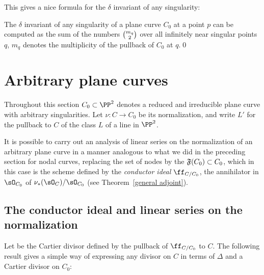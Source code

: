 This gives a nice formula for the $\delta$ invariant of any singularity:

\begin{corollary}
\label{computing delta}
The $\delta$ invariant of any singularity of a plane curve $C_{0}$ at
a point $p$ can be computed as the sum of the numbers $\tbinom{m_{q}}{2}$
over all infinitely near singular points $q$,
%
$m_{q}$
denotes the multiplicity of the pullback of $C_{0}$ at $q$.\qed
\end{corollary}

\section{Arbitrary plane curves} \label{arbitrary plane curves}

Throughout this section $C_0 \subset \PP^2$ denotes a reduced and
irreducible plane curve with arbitrary singularities. Let $\nu : C
\to C_0$ be its normalization, and write $L'$ for the pullback to $C$
of the class $L$ of a line in $\PP^{2}$.

It is possible to carry out an analysis of linear series on the
normalization of an arbitrary plane curve in a manner  analogous to
%
what we did in the preceding section for nodal curves, replacing 
the set of nodes by the 
%
$\adj(C_{0})\subset C_{0}$, which in this case is the scheme
%
%
defined by the \emph{conductor ideal} $\ff_{C/C_0}$, the annihilator
in $\sO_{C_{0}}$ of $\nu_{*}(\sO_{C})/\sO_{C_{0}}$
(see Theorem~\ref{general adjoint}). 

\subsection*{The conductor ideal and linear series on the normalization}

Let 
 be the Cartier
divisor
defined by the pullback of $\ff_{C/C_0}$ to $C$.
The following result gives a simple way of expressing any divisor on $C$
in terms of $\Delta$ and a
Cartier divisor on $C_{0}$:

